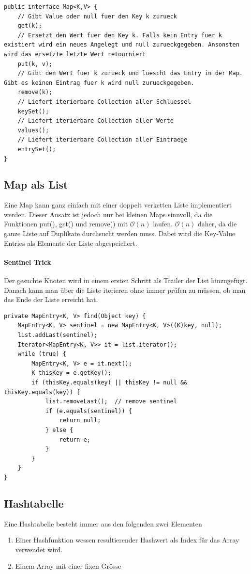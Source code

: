 \begin{lstlisting}
public interface Map<K,V> {
	// Gibt Value oder null fuer den Key k zurueck
	get(k);
	// Ersetzt den Wert fuer den Key k. Falls kein Entry fuer k existiert wird ein neues Angelegt und null zurueckgegeben. Ansonsten wird das ersetzte letzte Wert retourniert
	put(k, v);
	// Gibt den Wert fuer k zurueck und loescht das Entry in der Map. Gibt es keinen Eintrag fuer k wird null zurueckgegeben.
	remove(k);
	// Liefert iterierbare Collection aller Schluessel
	keySet();
	// Liefert iterierbare Collection aller Werte
	values();
	// Liefert iterierbare Collection aller Eintraege
	entrySet();
}
\end{lstlisting}

\subsection{Map als List}
Eine Map kann ganz einfach mit einer doppelt verketten Liste implementiert werden. Dieser Ansatz ist jedoch nur bei kleinen Maps sinnvoll, da die Funktionen put(), get() und remove() mit $\mathcal{O}(n)$ laufen. $\mathcal{O}(n)$ daher, da die ganze Liste auf Duplikate durchsucht werden muss. Dabei wird die Key-Value Entries als Elemente der Liste abgespeichert.

\paragraph{Sentinel Trick}
Der gesuchte Knoten wird in einem ersten Schritt als Trailer der List hinzugefügt. Danach kann man über die Liste iterieren ohne immer prüfen zu müssen, ob man das Ende der Liste erreicht hat.
\begin{lstlisting}
private MapEntry<K, V> find(Object key) {
	MapEntry<K, V> sentinel = new MapEntry<K, V>((K)key, null);
	list.addLast(sentinel); 
	Iterator<MapEntry<K, V>> it = list.iterator();
	while (true) {
		MapEntry<K, V> e = it.next();
		K thisKey = e.getKey();
		if (thisKey.equals(key) || thisKey != null && thisKey.equals(key)) {
			list.removeLast();  // remove sentinel
			if (e.equals(sentinel)) {
				return null;
			} else {
				return e;
			}
		}
	}
}
\end{lstlisting}

\subsection{Hashtabelle}
Eine Hashtabelle besteht immer aus den folgenden zwei Elementen
\begin{enumerate}
	\item Einer Hashfunktion wessen resultierender Hashwert als Index für das Array verwendet wird.
	\item Einem Array mit einer fixen Grösse 
\end{enumerate}

